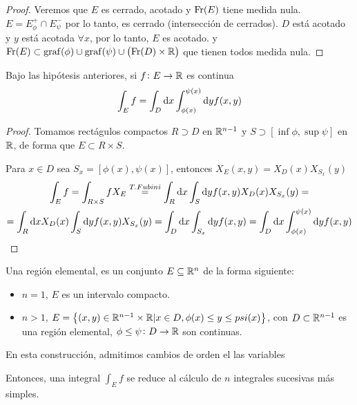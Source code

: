 \begin{proof}
    Veremos que $E$ es cerrado, acotado y $\operatorname{Fr}(E)$ tiene medida nula. $E = E^+_\phi
    \cap E^-_\psi$ por lo tanto, es cerrado (intersección de cerrados). $D$ está
    acotado y $y$ está acotada $\forall x$, por lo tanto, $E$ es acotado. y $\operatorname{Fr}(E)
    \subset \operatorname{graf}(\phi) \cup \operatorname{graf}(\psi) \cup \left( \operatorname{Fr}(D) \times \mathbb{R} \right)$ que
    tienen todos medida nula.
\end{proof}

\begin{prop}
    Bajo las hipótesis anteriores, si $f \colon E \to \mathbb{R}$ es continua
    \[
        \int_E f = \int_D \dif x \int^{\psi(x)}_{\phi(x)} \dif y f(x, y)
    \]
\end{prop}
\begin{proof}
    Tomamos rectágulos compactos $R \supset D$ en $\mathbb{R}^{n-1}$ y $S \supset [\inf\phi,
    \sup\psi]$ en $\mathbb{R}$, de forma que $E \subset R \times S$.

    Para $x \in D$ sea $S_x = [\phi(x), \psi(x)]$, entonces $X_E(x, y) =
    X_D(x)X_{S_x}(y)$
    \begin{gather*}
        \int_E f = \int_{R \times S} f X_E \stackrel{T. Fubini}{=}
        \int_R \dif x \int_S \dif y f(x, y) X_D(x) X_{S_x}(y) =\\= \int_R \dif x X_D(x) \int_S \dif y f(x,y) X_{S_x}(y) =
        \int_D \dif x \int_{S_x} \dif y f(x, y) = \int_D \dif x \int^{\psi(x)}_{\phi(x)} \dif y f(x,y)
    \end{gather*}
\end{proof}

\begin{defi}
    Una región elemental, es un conjunto $E \subseteq \mathbb{R}^n$ de la forma siguiente:
    \begin{itemize}
        \item $n = 1$, $E$ es un intervalo compacto.
        \item $n > 1$, $E = \left\{(x,y) \in \mathbb{R}^{n-1} \times \mathbb{R} \vert x \in D, \phi(x) \leq y \leq psi(x)\right\}$, con $D \subset \mathbb{R}^{n-1}$
            es una región elemental, $\phi \leq \psi \colon D \to \mathbb{R}$ son continuas.
    \end{itemize}

    En esta construcción, admitimos cambios de orden el las variables
\end{defi}

\begin{obs*}
    Entonces, una integral $\int_E f$ se reduce al cálculo de $n$ integrales sucesivas más simples.
\end{obs*}

